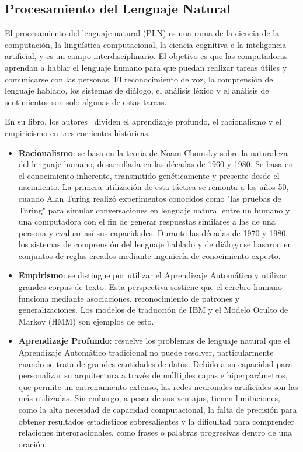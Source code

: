\subsection{Procesamiento del Lenguaje Natural}
El procesamiento del lenguaje natural (PLN) es una rama de la ciencia de la computación, la lingüística computacional, la ciencia cognitiva e la inteligencia artificial, y es un campo interdisciplinario. El objetivo es que las computadoras aprendan a hablar el lenguaje humano para que puedan realizar tareas útiles y comunicarse con las personas. El reconocimiento de voz, la comprensión del lenguaje hablado, los sistemas de diálogo, el análisis léxico y el análisis de sentimientos son solo algunas de estas tareas. \parencite{bk_deng2018deeplearningnlp}

En su libro, los autores \citeauthor{bk_deng2018deeplearningnlp} dividen el aprendizaje profundo, el racionalismo y el empiricismo en tres corrientes históricas.

\begin{itemize}
	\item \textbf{Racionalismo}: se basa en la teoría de Noam Chomsky sobre la naturaleza del lenguaje humano, desarrollada en las décadas de 1960 y 1980. Se basa en el conocimiento inherente, transmitido genéticamente y presente desde el nacimiento. La primera utilización de esta táctica se remonta a los años 50, cuando Alan Turing realizó experimentos conocidos como "las pruebas de Turing" para simular conversaciones en lenguaje natural entre un humano y una computadora con el fin de generar respuestas similares a las de una persona y evaluar así sus capacidades. Durante las décadas de 1970 y 1980, los sistemas de comprensión del lenguaje hablado y de diálogo se basaron en conjuntos de reglas creados mediante ingeniería de conocimiento experto.
	
	\item \textbf{Empirismo}: se distingue por utilizar el Aprendizaje Automático y utilizar grandes corpus de texto. Esta perspectiva sostiene que el cerebro humano funciona mediante asociaciones, reconocimiento de patrones y generalizaciones. Los modelos de traducción de IBM y el Modelo Oculto de Markov (HMM) son ejemplos de esto.
	
	\item \textbf{Aprendizaje Profundo}: resuelve los problemas de lenguaje natural que el Aprendizaje Automático tradicional no puede resolver, particularmente cuando se trata de grandes cantidades de datos. Debido a su capacidad para personalizar su arquitectura a través de múltiples capas e hiperparámetros, que permite un entrenamiento extenso, las redes neuronales artificiales son las más utilizadas. Sin embargo, a pesar de sus ventajas, tienen limitaciones, como la alta necesidad de capacidad computacional, la falta de precisión para obtener resultados estadísticos sobresalientes y la dificultad para comprender relaciones interoracionales, como frases o palabras progresivas dentro de una oración.
\end{itemize}


